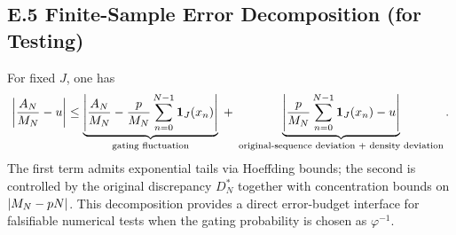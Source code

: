 \subsection{E.5 Finite-Sample Error Decomposition (for Testing)}

For fixed $J$, one has
\[
\left|\frac{A_N}{M_N}-u\right|
\le
\underbrace{\left|\frac{A_N}{M_N}-\frac{p}{M_N}\sum_{n=0}^{N-1}\mathbf{1}_J(x_n)\right|}_{\text{gating fluctuation}}
\;+\;
\underbrace{\left|\frac{p}{M_N}\sum_{n=0}^{N-1}\mathbf{1}_J(x_n)-u\right|}_{\text{original-sequence deviation + density deviation}}.
\]
The first term admits exponential tails via Hoeffding bounds; the second is controlled by the original discrepancy $D_N^*$ together with concentration bounds on $\left\lvert M_N-pN\right\rvert$. This decomposition provides a direct error-budget interface for falsifiable numerical tests when the gating probability is chosen as $\varphi^{-1}$.
